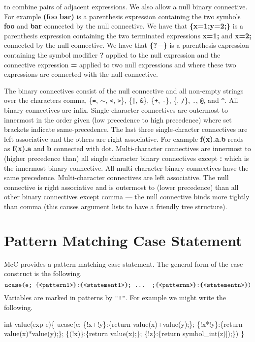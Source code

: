 \documentclass{article}
\newcommand{\mtt}[1]{\mbox{\tt #1}}
\begin{document}
\begin{itemize}
  to combine pairs of adjacent expressions.
  We also allow a null binary connective.  For example {\bf (foo bar)} is a parenthesis expression containing the two symbols {\bf foo} and {\bf bar} connected by the null connective.
  We have that {\bf \{x=1;y=2;\}} is a parenthesis expression containing the two terminated expressions {\bf x=1;} and {\bf x=2;} connected by the null connective.  We have that {\bf \{?=\}} is a parenthesis expression containing the symbol modifier {\bf ?} applied to the null expression
  and the connective expression {\bf =} applied to two null expressions and where these two expressions are connected with the null connective.
\end{itemize}

The binary connectives consist of the null connective and all non-empty strings over the characters comma, \{\mtt{=}, \mtt{$\sim$}, \mtt{<}, \mtt{>}\}, \{\mtt{|}, \mtt{\&}\}, \{\mtt{+},
\mtt{-}\}, \{\mtt{*}, \mtt{/}\}, \mtt{.}, \mtt{@}, and \mtt{\^{}}.  All binary connectives are infix.
Single-character connectives are outermost to innermost in the order given (low
precedence to high precedence) where set brackets indicate same-precedence.  The last three single-chracter connectives are left-associative and the
others are right-associative. For example {\bf f(x).a.b} reads as {\bf f(x).a} and {\bf b} connected with dot.  Multi-character connectives are
innermost to (higher precedence than) all single character binary connectives except {\bf :} which is the innermost binary connective. All multi-character binary connectives have the same
precedence.  Multi-character connectives are left associative.  The null connective is right associative and is outermost to (lower precedence) than all other binary connectives
except comma --- the null connective binds more tightly than comma (this causes argument lists to have a friendly tree structure).

\section{Pattern Matching Case Statement}

McC provides a pattern matching case statement.
The general form of the case construct is the following.
$$\mtt{ucase(e; \{<pattern1>\}:\{<statement1>\}; ... ;\{<patternn>\}:\{<statementn>\})}$$
Variables are marked in patterns by \mtt{"!"}. For example we might write the following.

\begin{code}
int value(exp e)\{
  ucase(e;
   \{!x+!y\}:\{return value(x)+value(y);\};
   \{!x*!y\}:\{return value(x)*value(y);\};
   \{(!x)\}:\{return value(x);\};
   \{!z\}:\{return symbol\_int(z)]);\})
\}
\end{code}
\end{document}
